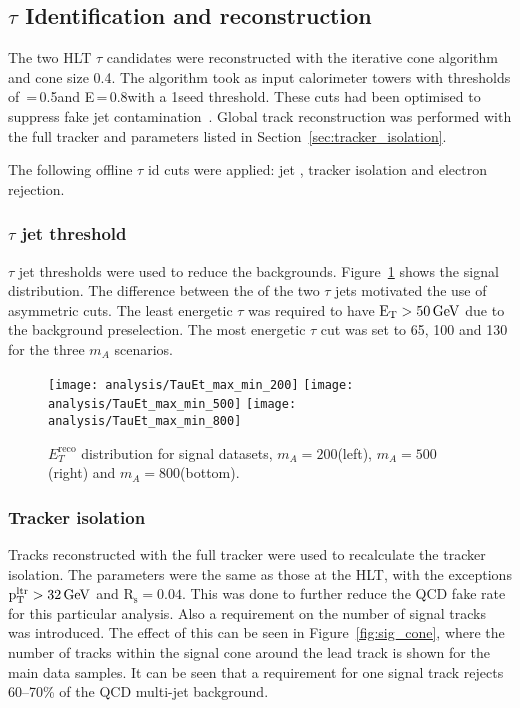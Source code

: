 \subsection{$\tau$ Identification and reconstruction}
The two HLT $\tau$ candidates were reconstructed with the iterative cone algorithm~\cite{CMS_TDR_PHYS_vol1} and cone size 0.4. The algorithm took as input calorimeter towers with thresholds of \ET\,=\,0.5\GeV and E\,=\,0.8\GeV with a 1\GeV seed threshold. These cuts had been optimised to suppress fake jet contamination~\cite{citeulike:903868}. Global track reconstruction was performed with the full tracker and parameters listed in Section~\ref{sec:tracker_isolation}.


The following offline $\tau$ id cuts were applied: jet \ET, tracker isolation and electron rejection.

\subsubsection{$\tau$ jet threshold}
$\tau$ jet \ET thresholds were used to reduce the backgrounds. Figure~\ref{fig:tau_max_min} shows the signal \ET distribution. The difference between the \ET of the two $\tau$ jets motivated the use of asymmetric \ET cuts. The least energetic $\tau$ was required to have $\mathrm{E_{\mathrm{T}}} > 50 \,\mathrm{Ge\hspace{-.08em}V}$ due to the background preselection. The most energetic $\tau$ \ET cut was set to 65, 100 and 130 \GeV for the three $m_{A}$ scenarios. 

\begin{figure}[tb]
\centering
\texttt{[image: analysis/TauEt\_max\_min\_200]}
\texttt{[image: analysis/TauEt\_max\_min\_500]}
\texttt{[image: analysis/TauEt\_max\_min\_800]}
\caption{$E_{T}^{\mathrm{reco}}$ distribution for signal datasets, $m_{A}=200$\GeVcc (left), $m_{A}=500$\GeVcc (right) and $m_{A}=800$\GeVcc (bottom).   
\label{fig:tau_max_min}}
\end{figure}

\subsubsection{Tracker isolation}
Tracks reconstructed with the full tracker were used to recalculate the tracker isolation. The parameters were the same as those at the HLT, with the exceptions $\mathrm{p_{T}^{ltr} > 32 \,\mathrm{Ge\hspace{-.08em}V}}$ and $\mathrm{R_{s}=0.04}$. This was done to further reduce the QCD fake rate for this particular analysis. Also a requirement on the number of signal tracks was introduced. The effect of this can be seen in Figure~\ref{fig:sig_cone}, where the number of tracks within the signal cone around the lead track is shown for the main data samples. It can be seen that a requirement for one signal track rejects 60--70\% of the QCD multi-jet background.

